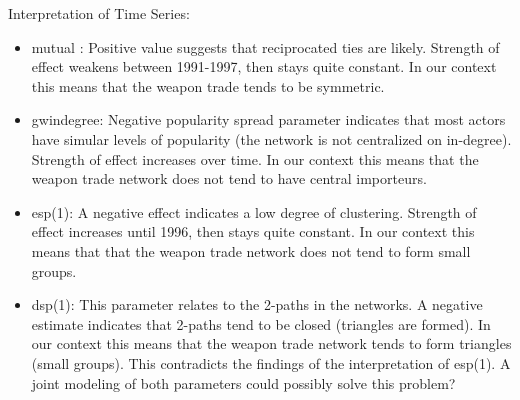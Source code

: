 \documentclass{article}
\begin{document}
Interpretation of Time Series:
\begin{itemize}
	\item mutual : Positive value suggests that reciprocated ties are likely. Strength of effect weakens between 1991-1997, then stays quite constant. In our context this means that the weapon trade tends to be symmetric.
	\item gwindegree: Negative popularity spread parameter indicates that most actors have simular levels of popularity (the network is not centralized on in-degree). Strength of effect increases over time. In our context this means that the weapon trade network does not tend to have central importeurs. 
	\item esp(1): A negative effect indicates a low degree of clustering. Strength of effect increases until 1996, then stays quite constant. In our context this means that that the weapon trade network does not tend to form small groups.
	\item dsp(1): This parameter relates to the 2-paths in the networks. A negative estimate indicates that 2-paths tend to be closed (triangles are formed). In our context this means that the weapon trade network tends to form triangles (small groups). This contradicts the findings of the interpretation of esp(1). A joint modeling of both parameters could possibly solve this problem?
	
\end{itemize}
\end{document}

